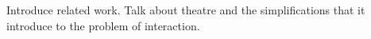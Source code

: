 Introduce related work.
Talk about theatre and the simplifications that it introduce to the problem of interaction.